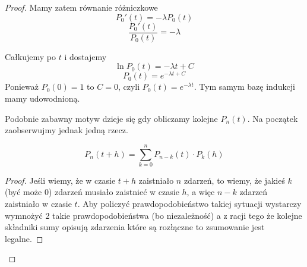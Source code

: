 \begin{proof}
	Mamy zatem równanie różniczkowe
	\[
		P_0'(t) = -\lambda P_0(t)
	\]
	\[
		\frac{P_0'(t)}{P_0(t)} = -\lambda
	\]

	Całkujemy po \( t \) i dostajemy
	\[
		\ln P_0(t) = -\lambda t + C
	\]
	\[
		P_0(t) = e^{-\lambda t + C}
	\]
	Ponieważ \( P_0(0) = 1 \) to \( C = 0\), czyli \( P_0(t) = e^{-\lambda t} \). Tym samym bazę indukcji mamy udowodnioną.

	Podobnie zabawny motyw dzieje się gdy obliczamy kolejne \( P_n(t) \). Na początek zaobserwujmy jednak jedną rzecz.

	\begin{fact}
		\[ P_{n}(t+h) = \sum_{k=0}^{n} P_{n-k}(t) \cdot P_k(h) \]
	\end{fact}
	\begin{proof}
		Jeśli wiemy, że w czasie \(t + h\) zaistniało \(n\) zdarzeń, to wiemy, że jakieś \(k\) (być może \(0\)) zdarzeń musiało zaistnieć w czasie \(h\), a więc \(n - k\) zdarzeń zaistniało w czasie \(t\). Aby policzyć prawdopodobieństwo takiej sytuacji wystarczy wymnożyć 2 takie prawdopodobieństwa (bo niezależność) a z racji tego że kolejne składniki sumy opisują zdarzenia które są rozłączne to zsumowanie jest legalne.
	\end{proof}


\end{proof}
